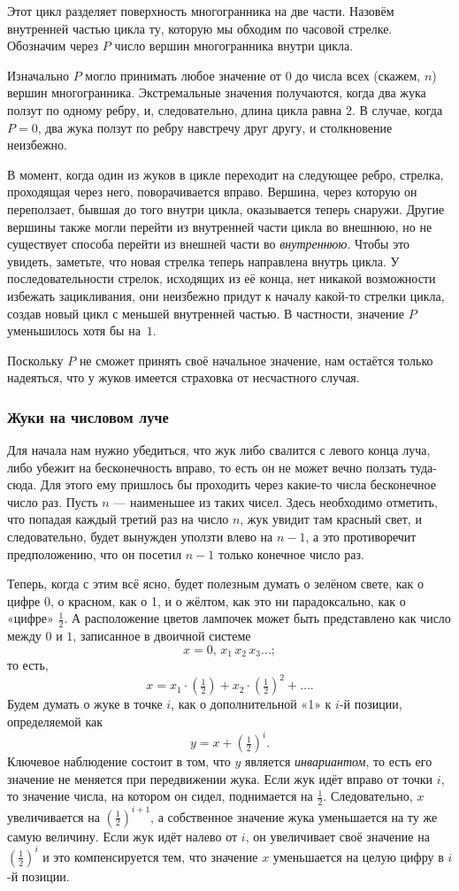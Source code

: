 Этот цикл разделяет поверхность многогранника на две части.
Назовём внутренней частью цикла ту, которую мы обходим по часовой стрелке.
Обозначим через $P$ число вершин многогранника внутри цикла.

Изначально $P$ могло принимать любое значение от $0$ до числа всех (скажем, $n$) вершин многогранника.
Экстремальные значения получаются, когда два жука ползут по одному ребру, и, следовательно, длина цикла равна $2$.
В случае, когда $P=0$, два жука ползут по ребру навстречу друг другу, и столкновение неизбежно.

В момент, когда один из жуков в цикле переходит на следующее ребро, стрелка, проходящая через него, поворачивается вправо.
Вершина, через которую он переползает, бывшая до того внутри цикла, оказывается теперь снаружи.
Другие вершины также могли перейти из внутренней части цикла во внешнюю, но не существует способа перейти из внешней части во \emph{внутреннюю}.
Чтобы это увидеть, заметьте, что новая стрелка теперь направлена внутрь цикла.
У последовательности стрелок, исходящих из её конца, нет никакой возможности избежать зацикливания, они неизбежно придут к началу какой-то стрелки цикла, создав новый цикл с меньшей внутренней частью.
В частности, значение $P$ уменьшилось хотя бы на~$1$.

Поскольку $P$ не сможет принять своё начальное значение, нам остаётся только надеяться, что у жуков имеется страховка от несчастного случая.
\heart

\subsubsection*{Жуки на числовом луче}%

Для начала нам нужно убедиться, что жук либо свалится с левого конца луча, либо убежит на бесконечность вправо, то есть он не может вечно ползать туда-сюда.
Для этого ему пришлось бы проходить через какие-то числа бесконечное число раз.
Пусть $n$ --- наименьшее из таких чисел.
Здесь необходимо отметить, что попадая каждый третий раз на число $n$, жук увидит там красный свет, и следовательно, будет вынужден уползти влево на $n-1$, а это противоречит предположению, что он посетил $n-1$ только конечное число раз.

Теперь, когда с этим всё ясно, будет полезным думать о зелёном свете, как о цифре 0, о красном, как о 1, и о жёлтом, как это ни парадоксально, как о «цифре» $\tfrac12$.
А расположение цветов лампочек может быть представлено как число между $0$ и $1$, записанное в двоичной системе
\[x = 0{,}\,x_1\,x_2\,x_3\dots;\]
то есть,
 \[x = x_1\cdot(\tfrac12)+x_2\cdot(\tfrac12)^2+\dots.\]
Будем думать о жуке в точке $i$, как о дополнительной «1» к $i$-й позиции, определяемой как
\[y=x+(\tfrac12)^i.\]
Ключевое наблюдение состоит в том, что $y$ является \emph{инвариантом}, то есть его значение не меняется при передвижении жука.
Если жук идёт вправо от точки $i$, то значение числа, на котором он сидел, поднимается на $\tfrac12$.
Следовательно, $x$ увеличивается на $(\tfrac12)^{i+1}$, а собственное значение жука уменьшается на ту же самую величину.
Если жук идёт налево от $i$, он увеличивает своё значение на $(\tfrac12)^i$ и это компенсируется тем, что значение $x$ уменьшается на целую цифру в $i$-й позиции.

